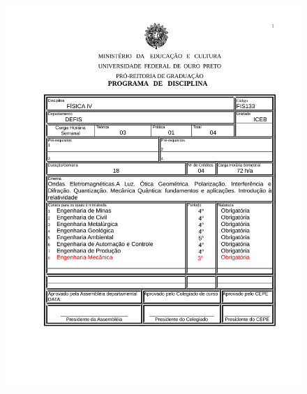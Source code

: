 \begin{figure}[p]
	\centering 
	\includegraphics[scale=0.7]{capitulos/anexo1-programas-disciplina/p45.pdf}
\end{figure}


